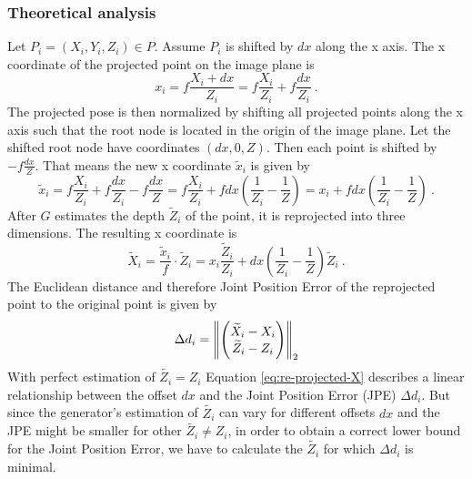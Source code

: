 \subsubsection{Theoretical analysis}
Let $P_i = (X_i, Y_i, Z_i) \in P$. 
Assume $P_i$ is shifted by $dx$ along the x axis.
The x coordinate of the projected point on the image plane is
\begin{equation}
	x_i = f \frac{X_i + dx}{Z_i} = f \frac{X_i}{Z_i} + f \frac{dx}{Z_i}\ .
\end{equation}
The projected pose is then normalized by shifting all projected points along the x axis such that the root node is located in the origin of the image plane.
Let the shifted root node have coordinates $(dx, 0, Z)$.
Then each point is shifted by $- f \frac{dx}{Z}$.
That means the new x coordinate $\widetilde{x}_i$ is given by
\begin{equation}
	\widetilde{x}_i = f \frac{X_i}{Z_i} + f \frac{dx}{Z_i} - f \frac{dx}{Z} 
	= f \frac{X_i}{Z_i} + f dx (\frac{1}{Z_i} - \frac{1}{Z})
	= x_i + f dx (\frac{1}{Z_i} - \frac{1}{Z})\ .
\end{equation}
After $G$ estimates the depth $\widetilde{Z}_i$ of the point, it is reprojected into three dimensions. The resulting x coordinate is 
\begin{equation}
	\label{eq:re-projected-X}
	\widetilde{X}_i = \frac{\widetilde{x}_i}{f} \cdot \widetilde{Z}_i
	= x_i \frac{\widetilde{Z}_i}{Z_i} + dx (\frac{1}{Z_i} - \frac{1}{Z}) \widetilde{Z}_i \ .
\end{equation}
The Euclidean distance and therefore Joint Position Error of the reprojected point to the original point is given by
\begin{equation}
\label{eq:delta-d}
	\Delta d_i = \norm{ 
	\begin{pmatrix}
		\widetilde{X}_i - X_i \\
		\widetilde{Z}_i - Z_i
	\end{pmatrix}
	}_2
\end{equation}
With perfect estimation of $\widetilde{Z_i} = Z_i$ Equation \eqref{eq:re-projected-X} describes a linear relationship between the offset $dx$ and the Joint Position Error (JPE) $\Delta d_i$.
But since the generator's estimation of $\widetilde{Z_i}$ can vary for different offsets $dx$ and the JPE might be smaller for other $\widetilde{Z_i} \neq Z_i$, in order to obtain a correct lower bound for the Joint Position Error, we have to calculate the $\widetilde{Z_i}$ for which $\Delta d_i$ is minimal.
